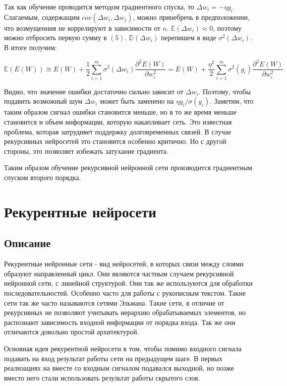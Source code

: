 \documentclass[14pt]{article}
\begin{document}
Так как обучение проводится методом градиентного спуска, то $\Delta w_i = -\eta g_i$.  Слагаемым, содержащим $cov(\Delta w_i, \Delta w_j)$, можно принебречь в предположении, что возмущенния не коррелируют в зависимости от $n$. $\mathbb{E}(\Delta w_i)\approx 0$, поэтому можно отбросить первую сумму в $(5)$. $\mathbb{D}(\Delta w_i)$ перепишем в виде $\sigma^2(\Delta w_i)$. В итоге получим:


\begin{equation}
\mathbb{E}(E(W)) \cong E(W) +
\frac{1}{2}\sum\limits_{i=1}^{m}\sigma^2(\Delta w_i)\frac{\partial^2E(W)}{\partial w_i^2} = E(W) + \frac{\eta^2}{2}\sum\limits_{i=1}^{m}\sigma^2(g_i)\frac{\partial^2E(W)}{\partial w_i^2}
\end{equation}


Видно, что значение ошибки достаточно сильно зависит от $\Delta w_i$. Поэтому, чтобы подавить возможный шум $\Delta w_i$ может быть заменено на $\eta g_i / \sigma(g_i)$. Заметим, что таким образом сигнал ошибки становится меньше, но в то же время меньше становится и объем информации, которую накапливает сеть. Это известная проблема, которая затрудняет поддержку долговременных связей. В случае рекурсивных нейросетей это становится особенно критично. Но с другой стороны, это позволяет избежать затухание градиента.


Таким образом обучение рекурсивной нейронной сети производится градиентным спуском второго порядка.
\section{Рекурентные нейросети}

\subsection{Описание}
Рекурентные нейронные сети - вид нейросетей, в которых связи между слоями образуют направленный цикл. Они являются частным случаем рекурсивной нейронной сети, с линейной структурой. Они так же используются для обработки последовательностей. Особенно часто для работы с рукописным текстом. Такие сети так же часто называются сетями Эльмана. Такие сети, в отличие от рекурсивных не позволяют учитывать иерархию обрабатываемых элементов, но распознают зависимость входной информации от порядка входа. Так же они отличаются довольно простой архитектурой.


Основная идея рекурентной нейросети в том, чтобы помимо входного сигнала подавать на вход результат работы сети на предыдущем шаге. В первых реализациях на вместе со входным сигналом подавался выходной, но позже вместо него стали использовать результат работы скрытого слоя.
\end{document}
